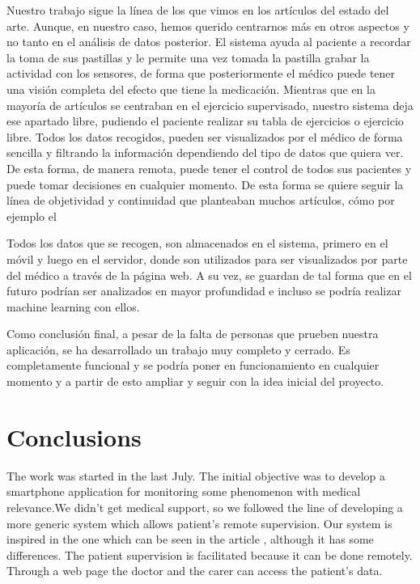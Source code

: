 \documentclass[11pt,spanish]{article}
\begin{document}
Nuestro trabajo sigue la línea de los que vimos en los artículos del estado del arte. Aunque, en nuestro caso, hemos querido centrarnos más en otros aspectos y no tanto en el análisis de datos posterior. El sistema ayuda al paciente a recordar la toma de sus pastillas y le permite una vez tomada la pastilla grabar la actividad con los sensores, de forma que posteriormente el médico puede tener una visión completa del efecto que tiene la medicación. Mientras que en la mayoría de artículos se centraban en el ejercicio supervisado, nuestro sistema deja ese apartado libre, pudiendo el paciente realizar su tabla de ejercicios o ejercicio libre. Todos los datos recogidos, pueden ser visualizados por el médico de forma sencilla y filtrando la información dependiendo del tipo de datos que quiera ver. De esta forma, de manera remota, puede tener el control de todos sus pacientes y puede tomar decisiones en cualquier momento. De esta forma se quiere seguir la línea de objetividad y continuidad que planteaban muchos artículos, cómo por ejemplo el \cite{resumen2}
\newline

Todos los datos que se recogen, son almacenados en el sistema, primero en el móvil y luego en el servidor, donde son utilizados para ser visualizados por parte del médico a través de la página web. A su vez, se guardan de tal forma que en el futuro podrían ser analizados en mayor profundidad e incluso se podría realizar machine learning con ellos.
\newline

Como conclusión final, a pesar de la falta de personas que prueben nuestra aplicación, se ha desarrollado un trabajo muy completo y cerrado. Es completamente funcional y se podría poner en funcionamiento en cualquier momento y a partir de esto ampliar y seguir con la idea inicial del proyecto.
\newpage

\section{Conclusions}

The work was started in the last July. The initial objective was to develop a smartphone application for monitoring some phenomenon with medical relevance.We didn’t get medical support, so we followed the line of developing a more generic system which allows patient’s remote supervision. Our system is inspired in the one which can be seen in the article \cite{resumen1}, although it has some differences. The patient supervision is facilitated because it can be done remotely. Through a web page the doctor and the carer can access the patient’s data.
\newline
\end{document}
